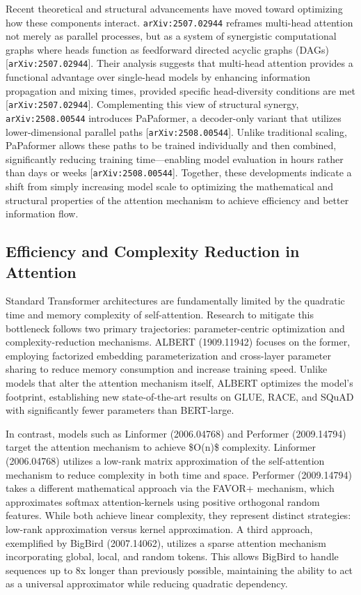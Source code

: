 \documentclass[11pt]{article}
\begin{document}
Recent theoretical and structural advancements have moved toward optimizing how these components interact. \texttt{arXiv:2507.02944} reframes multi-head attention not merely as parallel processes, but as a system of synergistic computational graphs where heads function as feedforward directed acyclic graphs (DAGs) [\texttt{arXiv:2507.02944}]. Their analysis suggests that multi-head attention provides a functional advantage over single-head models by enhancing information propagation and mixing times, provided specific head-diversity conditions are met [\texttt{arXiv:2507.02944}]. Complementing this view of structural synergy, \texttt{arXiv:2508.00544} introduces PaPaformer, a decoder-only variant that utilizes lower-dimensional parallel paths [\texttt{arXiv:2508.00544}]. Unlike traditional scaling, PaPaformer allows these paths to be trained individually and then combined, significantly reducing training time—enabling model evaluation in hours rather than days or weeks [\texttt{arXiv:2508.00544}]. Together, these developments indicate a shift from simply increasing model scale to optimizing the mathematical and structural properties of the attention mechanism to achieve efficiency and better information flow.

\subsection{Efficiency and Complexity Reduction in Attention}

Standard Transformer architectures are fundamentally limited by the quadratic time and memory complexity of self-attention. Research to mitigate this bottleneck follows two primary trajectories: parameter-centric optimization and complexity-reduction mechanisms. ALBERT (1909.11942) focuses on the former, employing factorized embedding parameterization and cross-layer parameter sharing to reduce memory consumption and increase training speed. Unlike models that alter the attention mechanism itself, ALBERT optimizes the model's footprint, establishing new state-of-the-art results on GLUE, RACE, and SQuAD with significantly fewer parameters than BERT-large.

In contrast, models such as Linformer (2006.04768) and Performer (2009.14794) target the attention mechanism to achieve \$O(n)\$ complexity. Linformer (2006.04768) utilizes a low-rank matrix approximation of the self-attention mechanism to reduce complexity in both time and space. Performer (2009.14794) takes a different mathematical approach via the FAVOR+ mechanism, which approximates softmax attention-kernels using positive orthogonal random features. While both achieve linear complexity, they represent distinct strategies: low-rank approximation versus kernel approximation. A third approach, exemplified by BigBird (2007.14062), utilizes a sparse attention mechanism incorporating global, local, and random tokens. This allows BigBird to handle sequences up to 8x longer than previously possible, maintaining the ability to act as a universal approximator while reducing quadratic dependency.
\end{document}
